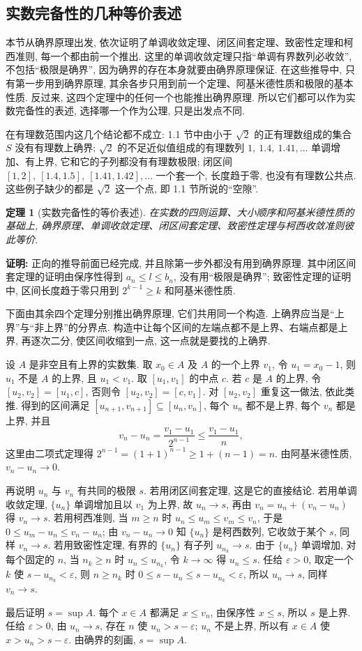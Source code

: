 \documentclass[UTF8,openany]{ctexbook}
\theoremstyle{chinesetextbook}
\newtheorem{theorem}{定理}[section]
\newenvironment{cnproof}{\par\indent\textbf{证明:} \ignorespaces}{\par}
\begin{document}
\subsection{实数完备性的几种等价表述}
本节从确界原理出发, 依次证明了单调收敛定理、闭区间套定理、致密性定理和柯西准则, 每一个都由前一个推出. 这里的单调收敛定理只指“单调有界数列必收敛”, 不包括“极限是确界”, 因为确界的存在本身就要由确界原理保证. 在这些推导中, 只有第一步用到确界原理, 其余各步只用到前一个定理、阿基米德性质和极限的基本性质. 反过来, 这四个定理中的任何一个也能推出确界原理. 所以它们都可以作为实数完备性的表述, 选择哪一个作为公理, 只是出发点不同.

在有理数范围内这几个结论都不成立: 1.1 节中由小于 $\sqrt2$ 的正有理数组成的集合 $S$ 没有有理数上确界; $\sqrt2$ 的不足近似值组成的有理数列 $1,\ 1.4,\ 1.41,\ldots$ 单调增加、有上界, 它和它的子列都没有有理数极限; 闭区间 $[1,2],\ [1.4,1.5],\ [1.41,1.42],\ldots$ 一个套一个, 长度趋于零, 也没有有理数公共点. 这些例子缺少的都是 $\sqrt2$ 这一个点, 即 1.1 节所说的“空隙”.
\begin{theorem}[实数完备性的等价表述]
在实数的四则运算、大小顺序和阿基米德性质的基础上, 确界原理、单调收敛定理、闭区间套定理、致密性定理与柯西收敛准则彼此等价.
\end{theorem}
\begin{cnproof}
正向的推导前面已经完成, 并且除第一步外都没有用到确界原理. 其中闭区间套定理的证明由保序性得到 $a_n\le l\le b_n$, 没有用“极限是确界”; 致密性定理的证明中, 区间长度趋于零只用到 $2^{k-1}\ge k$ 和阿基米德性质.

下面由其余四个定理分别推出确界原理, 它们共用同一个构造. 上确界应当是“上界”与“非上界”的分界点. 构造中让每个区间的左端点都不是上界、右端点都是上界, 再逐次二分, 使区间收缩到一点, 这一点就是要找的上确界.

设 $A$ 是非空且有上界的实数集. 取 $x_0\in A$ 及 $A$ 的一个上界 $v_1$, 令 $u_1=x_0-1$, 则 $u_1$ 不是 $A$ 的上界, 且 $u_1<v_1$. 取 $[u_1,v_1]$ 的中点 $c$. 若 $c$ 是 $A$ 的上界, 令 $[u_2,v_2]=[u_1,c]$, 否则令 $[u_2,v_2]=[c,v_1]$. 对 $[u_2,v_2]$ 重复这一做法, 依此类推. 得到的区间满足 $[u_{n+1},v_{n+1}]\subseteq[u_n,v_n]$, 每个 $u_n$ 都不是上界, 每个 $v_n$ 都是上界, 并且
\[
v_n-u_n=\frac{v_1-u_1}{2^{n-1}}\le\frac{v_1-u_1}n,
\]
这里由二项式定理得 $2^{n-1}=(1+1)^{n-1}\ge1+(n-1)=n$. 由阿基米德性质, $v_n-u_n\to0$.

再说明 $u_n$ 与 $v_n$ 有共同的极限 $s$. 若用闭区间套定理, 这是它的直接结论. 若用单调收敛定理, $\{u_n\}$ 单调增加且以 $v_1$ 为上界, 故 $u_n\to s$, 再由 $v_n=u_n+(v_n-u_n)$ 得 $v_n\to s$. 若用柯西准则, 当 $m\ge n$ 时 $u_n\le u_m\le v_m\le v_n$, 于是 $0\le u_m-u_n\le v_n-u_n$; 由 $v_n-u_n\to0$ 知 $\{u_n\}$ 是柯西数列, 它收敛于某个 $s$, 同样 $v_n\to s$. 若用致密性定理, 有界的 $\{u_n\}$ 有子列 $u_{n_k}\to s$. 由于 $\{u_n\}$ 单调增加, 对每个固定的 $n$, 当 $n_k\ge n$ 时 $u_n\le u_{n_k}$, 令 $k\to\infty$ 得 $u_n\le s$. 任给 $\varepsilon>0$, 取定一个 $k$ 使 $s-u_{n_k}<\varepsilon$, 则 $n\ge n_k$ 时 $0\le s-u_n\le s-u_{n_k}<\varepsilon$, 所以 $u_n\to s$, 同样 $v_n\to s$.

最后证明 $s=\sup A$. 每个 $x\in A$ 都满足 $x\le v_n$, 由保序性 $x\le s$, 所以 $s$ 是上界. 任给 $\varepsilon>0$, 由 $u_n\to s$, 存在 $n$ 使 $u_n>s-\varepsilon$; $u_n$ 不是上界, 所以有 $x\in A$ 使 $x>u_n>s-\varepsilon$. 由确界的刻画, $s=\sup A$.
\end{cnproof}
\end{document}
